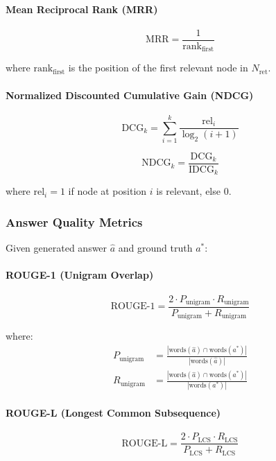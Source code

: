 \documentclass[12pt,a4paper]{article}
\begin{document}
\paragraph{Mean Reciprocal Rank (MRR)}
\begin{equation}
\text{MRR} = \frac{1}{\text{rank}_{\text{first}}}
\end{equation}

where $\text{rank}_{\text{first}}$ is the position of the first relevant node in $N_{\text{ret}}$.

\paragraph{Normalized Discounted Cumulative Gain (NDCG)}
\begin{equation}
\text{DCG}_k = \sum_{i=1}^{k} \frac{\text{rel}_i}{\log_2(i + 1)}
\end{equation}

\begin{equation}
\text{NDCG}_k = \frac{\text{DCG}_k}{\text{IDCG}_k}
\end{equation}

where $\text{rel}_i = 1$ if node at position $i$ is relevant, else 0.

\subsubsection{Answer Quality Metrics}

Given generated answer $\hat{a}$ and ground truth $a^*$:

\paragraph{ROUGE-1 (Unigram Overlap)}
\begin{equation}
\text{ROUGE-1} = \frac{2 \cdot P_{\text{unigram}} \cdot R_{\text{unigram}}}{P_{\text{unigram}} + R_{\text{unigram}}}
\end{equation}

where:
\begin{align*}
P_{\text{unigram}} &= \frac{|\text{words}(\hat{a}) \cap \text{words}(a^*)|}{|\text{words}(\hat{a})|} \\
R_{\text{unigram}} &= \frac{|\text{words}(\hat{a}) \cap \text{words}(a^*)|}{|\text{words}(a^*)|}
\end{align*}

\paragraph{ROUGE-L (Longest Common Subsequence)}
\begin{equation}
\text{ROUGE-L} = \frac{2 \cdot P_{\text{LCS}} \cdot R_{\text{LCS}}}{P_{\text{LCS}} + R_{\text{LCS}}}
\end{equation}
\end{document}
